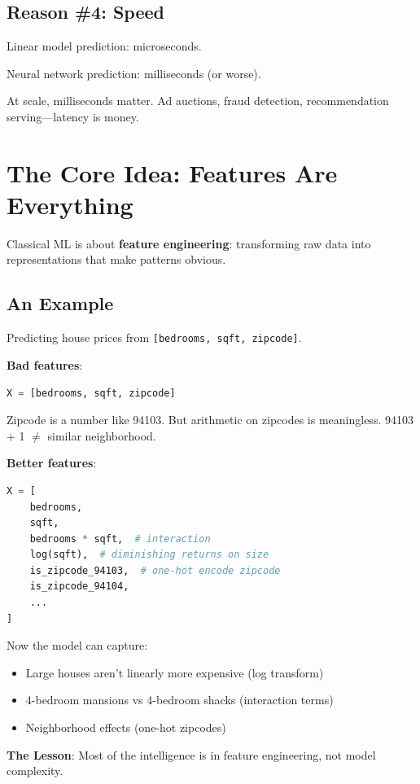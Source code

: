\documentclass[11pt,oneside]{book}
\begin{document}
\subsection{Reason \#4: Speed}

Linear model prediction: microseconds.

Neural network prediction: milliseconds (or worse).

At scale, milliseconds matter. Ad auctions, fraud detection, recommendation serving—latency is money.

\section{The Core Idea: Features Are Everything}

Classical ML is about \textbf{feature engineering}: transforming raw data into representations that make patterns obvious.

\subsection{An Example}

Predicting house prices from \texttt{[bedrooms, sqft, zipcode]}.

\textbf{Bad features}:
\begin{lstlisting}[language=Python]
X = [bedrooms, sqft, zipcode]
\end{lstlisting}

Zipcode is a number like 94103. But arithmetic on zipcodes is meaningless. 94103 + 1 $\neq$ similar neighborhood.

\textbf{Better features}:
\begin{lstlisting}[language=Python]
X = [
    bedrooms,
    sqft,
    bedrooms * sqft,  # interaction
    log(sqft),  # diminishing returns on size
    is_zipcode_94103,  # one-hot encode zipcode
    is_zipcode_94104,
    ...
]
\end{lstlisting}

Now the model can capture:
\begin{itemize}
    \item Large houses aren't linearly more expensive (log transform)
    \item 4-bedroom mansions vs 4-bedroom shacks (interaction terms)
    \item Neighborhood effects (one-hot zipcodes)
\end{itemize}

\textbf{The Lesson}: Most of the intelligence is in feature engineering, not model complexity.
\end{document}

